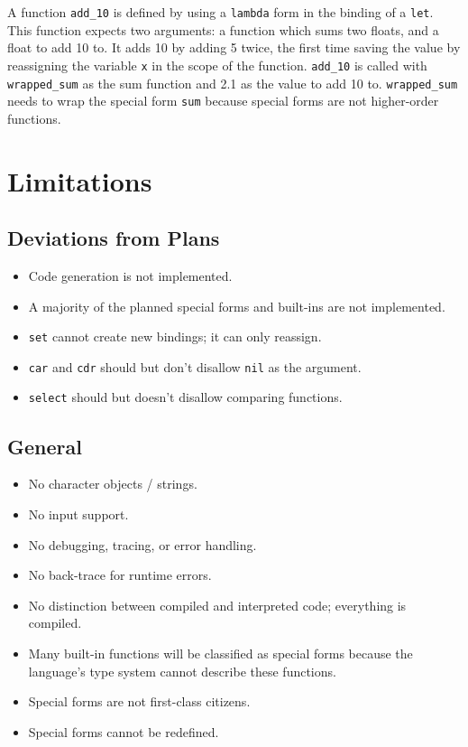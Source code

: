 \documentclass[a4paper, 12pt]{article}
\begin{document}
A function \texttt{add\_10} is defined by using a \texttt{lambda} form in the binding of a \texttt{let}. This function expects two arguments: a function which sums two floats, and a float to add 10 to. It adds 10 by adding 5 twice, the first time saving the value by reassigning the variable \texttt{x} in the scope of the function. \texttt{add\_10} is called with \texttt{wrapped\_sum} as the sum function and 2.1 as the value to add 10 to. \texttt{wrapped\_sum} needs to wrap the special form \texttt{sum} because special forms are not higher-order functions.

\section{Limitations}
\subsection{Deviations from Plans}
\begin{itemize}
    \item Code generation is not implemented.
    \item A majority of the planned special forms and built-ins are not implemented.
    \item \texttt{set} cannot create new bindings; it can only reassign.
    \item \texttt{car} and \texttt{cdr} should but don't disallow \texttt{nil} as the argument.
    \item \texttt{select} should but doesn't disallow comparing functions.
\end{itemize}

\subsection{General}
\begin{itemize}
    \item No character objects / strings.
    \item No input support.
    \item No debugging, tracing, or error handling.
    \item No back-trace for runtime errors.
    \item No distinction between compiled and interpreted code; everything is compiled.
    \item Many built-in functions will be classified as special forms because the language's type system cannot describe these functions.
    \item Special forms are not first-class citizens.
    \item Special forms cannot be redefined.
\end{itemize}
\end{document}
